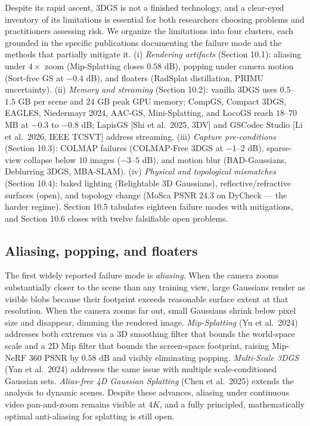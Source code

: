 Despite its rapid ascent, 3DGS is not a finished technology, and a clear-eyed inventory of its limitations is essential for both researchers choosing problems and practitioners assessing risk. We organize the limitations into four clusters, each grounded in the specific publications documenting the failure mode and the methods that partially mitigate it. (i) \emph{Rendering artifacts} (Section 10.1): aliasing under \(4\times\) zoom (Mip-Splatting closes \(0.58\) dB), popping under camera motion (Sort-free GS at \(-0.4\) dB), and floaters (RadSplat distillation, PRIMU uncertainty). (ii) \emph{Memory and streaming} (Section 10.2): vanilla 3DGS uses \(0.5\)--\(1.5\) GB per scene and \(24\) GB peak GPU memory; CompGS, Compact 3DGS, EAGLES, Niedermayr 2024, AAC-GS, Mini-Splatting, and LocoGS reach \(18\)--\(70\) MB at \(-0.3\) to \(-0.8\) dB; LapisGS {[}Shi et al.~2025, 3DV{]} and GSCodec Studio {[}Li et al.~2026, IEEE TCSVT{]} address streaming. (iii) \emph{Capture pre-conditions} (Section 10.3): COLMAP failures (COLMAP-Free 3DGS at \(-1\)--\(2\) dB), sparse-view collapse below \(10\) images (\(-3\)--\(5\) dB), and motion blur (BAD-Gaussians, Deblurring 3DGS, MBA-SLAM). (iv) \emph{Physical and topological mismatches} (Section 10.4): baked lighting (Relightable 3D Gaussians), reflective/refractive surfaces (open), and topology change (MoSca PSNR \(24.3\) on DyCheck --- the harder regime). Section 10.5 tabulates eighteen failure modes with mitigations, and Section 10.6 closes with twelve falsifiable open problems.

\subsection{Aliasing, popping, and floaters}\label{aliasing-popping-and-floaters}

The first widely reported failure mode is \emph{aliasing}. When the camera zooms substantially closer to the scene than any training view, large Gaussians render as visible blobs because their footprint exceeds reasonable surface extent at that resolution. When the camera zooms far out, small Gaussians shrink below pixel size and disappear, dimming the rendered image. \emph{Mip-Splatting} (Yu et al.~2024) addresses both extremes via a 3D smoothing filter that bounds the world-space scale and a 2D Mip filter that bounds the screen-space footprint, raising Mip-NeRF 360 PSNR by \(0.58\) dB and visibly eliminating popping. \emph{Multi-Scale 3DGS} (Yan et al.~2024) addresses the same issue with multiple scale-conditioned Gaussian sets. \emph{Alias-free 4D Gaussian Splatting} (Chen et al.~2025) extends the analysis to dynamic scenes. Despite these advances, aliasing under continuous video pan-and-zoom remains visible at \(4K\), and a fully principled, mathematically optimal anti-aliasing for splatting is still open.

